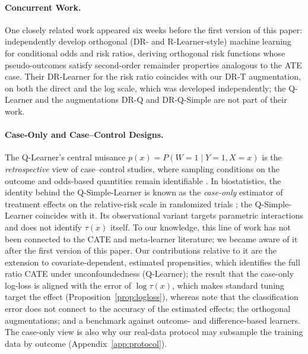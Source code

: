 \documentclass{article}
\begin{document}
\paragraph{Concurrent Work.}
One closely related work appeared six weeks before the first version
of this paper: \citet{ge2026orthogonal} independently develop
orthogonal (DR- and R-Learner-style) machine learning for conditional
odds and risk ratios, deriving orthogonal risk functions whose
pseudo-outcomes satisfy second-order remainder properties analogous
to the ATE case. Their DR-Learner for the risk ratio coincides with our
DR-T augmentation, on both the direct and the log scale, which was
developed independently; the Q-Learner and the augmentations DR-Q and
DR-Q-Simple are not part of their work.

\paragraph{Case-Only and Case--Control Designs.}
The Q-Learner's central nuisance $p(x) = P(W{=}1 \mid Y{=}1, X{=}x)$
is the \emph{retrospective} view of case--control studies, where
sampling conditions on the outcome and odds-based quantities remain
identifiable \citep{prentice1979}. In biostatistics, the identity
behind the Q-Simple-Learner is known as the \emph{case-only} estimator
of treatment effects on the relative-risk scale in randomized trials
\citep{vittinghoff2006case, dai2018case, dai2019trees}; the Q-Simple-Learner
coincides with it. Its observational variant
\citep{tchetgen2010semiparametric} targets parametric interactions and
does not identify $\tau(x)$ itself. To our knowledge, this line of work
has not been connected to the CATE and meta-learner literature; we
became aware of it after the first version of this paper. Our
contributions relative to it are the extension to covariate-dependent,
estimated propensities, which identifies the full ratio CATE under
unconfoundedness (Q-Learner); the result that the case-only log-loss is aligned with the
error of $\log\tau(x)$, which makes standard tuning target the effect
(Proposition~\ref{prop:logloss}), whereas \citet{dai2019trees} note that
the classification error does not connect to the accuracy of the
estimated effects; the orthogonal augmentations; and a benchmark against outcome- and difference-based learners. The
case-only view is also why our real-data protocol may subsample the
training data by outcome (Appendix~\ref{app:protocol}).
\end{document}
